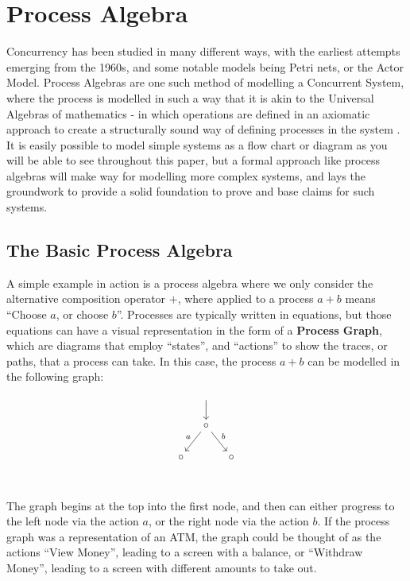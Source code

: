 \documentclass[../hons_project.tex]{subfiles}
\begin{document}
\section{Process Algebra}
Concurrency has been studied in many different ways, with the earliest attempts emerging from the 1960s, and some notable models being Petri nets, or the Actor Model. Process Algebras are one such method of modelling a Concurrent System, where the process is modelled in such a way that it is akin to the Universal Algebras of mathematics - in which operations are defined in an axiomatic approach to create a structurally sound way of defining processes in the system \citep{baetenBriefHistoryProcess2005}. It is easily possible to model simple systems as a flow chart or diagram as you will be able to see throughout this paper, but a formal approach like process algebras will make way for modelling more complex systems, and lays the groundwork to provide a solid foundation to prove and base claims for such systems.

\subsection{The Basic Process Algebra}
A simple example in action is a process algebra where we only consider the alternative composition operator $+$, where applied to a process $a + b$ means ``Choose $a$, or choose $b$''. Processes are typically written in equations, but those equations can have a visual representation in the form of a \textbf{Process Graph}, which are diagrams that employ ``states'', and ``actions'' to show the traces, or paths, that a process can take. In this case, the process $a + b$ can be modelled in the following graph:

\[\begin{tikzcd}[cramped,column sep=small]
	& {} \\
	& \circ \\
	\circ && \circ \\
	\arrow[from=1-2, to=2-2]
	\arrow["a"', from=2-2, to=3-1]
	\arrow["b", from=2-2, to=3-3]
\end{tikzcd}\]

The graph begins at the top into the first node, and then can either progress to the left node via the action $a$, or the right node via the action $b$. If the process graph was a representation of an ATM, the graph could be thought of as the actions ``View Money'', leading to a screen with a balance, or ``Withdraw Money'', leading to a screen with different amounts to take out.
\end{document}
